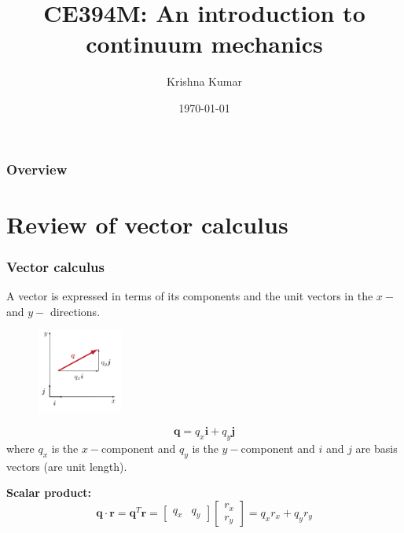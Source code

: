 \documentclass[notes]{beamer}
\title[CE394M: Continuum mechanics]{CE394M: An introduction to continuum mechanics}
\author{Krishna Kumar} %
\institute[UT Austin] %
{
University of Texas at Austin \\
\medskip
\textit{
  \url{krishnak@utexas.edu}} %
}
\date{\today} %
\begin{document}
\begin{frame}
\titlepage %
\end{frame}

\begin{frame}
 \frametitle{Overview}
 \tableofcontents
\end{frame}

\section{Review of vector calculus}
\begin{frame}
\frametitle{Vector calculus}
A vector is expressed in terms of its components and the unit vectors in the $x-$ and $y-$ directions.
\begin{figure}[ht]
	\centering
	\includegraphics[width=0.25\textwidth]{figs/vector-q.png}
\end{figure}
\begin{equation*}
	\mathbf{q} = q_x \mathbf{i} + q_y \mathbf{j}
\end{equation*}
where $q_x$ is the $x-$component and $q_y$ is the $y-$component and $i$ and $j$ are basis vectors (are unit length).

\textbf{Scalar product:}
\begin{equation*}
\mathbf{q} \cdot \mathbf{r} = \mathbf{q}^T \mathbf{r} = \begin{bmatrix} q_x & q_y \end{bmatrix} \begin{bmatrix} r_x \\ r_y \end{bmatrix} = q_x r_x + q_y r_y
\end{equation*}
\end{frame}
\end{document}

